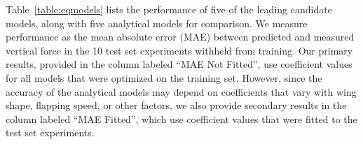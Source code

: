 \documentclass{article}
\begin{document}
Table~\ref{table:eqmodels} lists the performance of five of the leading
candidate models, along with five analytical models for comparison. We measure
performance as the mean absolute error (MAE) between predicted and measured
vertical force in the 10 test set experiments withheld from training. Our
primary results, provided in the column labeled ``MAE Not Fitted'', use
coefficient values for all models that were optimized on the training set.
However, since the accuracy of the analytical models may depend on coefficients
that vary with wing shape, flapping speed, or other factors, we also provide
secondary results in the column labeled ``MAE Fitted'', which use coefficient
values that were fitted to the test set experiments.

\end{document}
